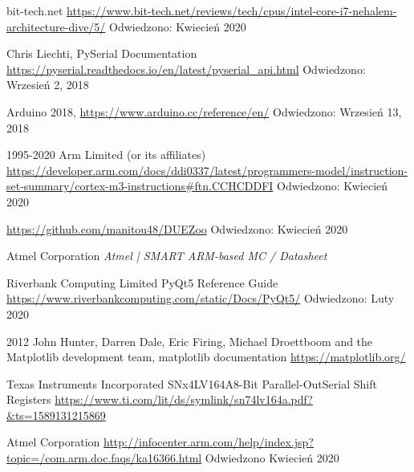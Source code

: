 \begin{thebibliography}{99}
        bit-tech.net
        \url{https://www.bit-tech.net/reviews/tech/cpus/intel-core-i7-nehalem-architecture-dive/5/}
        Odwiedzono:
        Kwiecień 2020

        Chris Liechti,	
        PySerial Documentation
	\url{https://pyserial.readthedocs.io/en/latest/pyserial_api.html}
        Odwiedzono: Wrzesień 2, 2018
        
	 Arduino 2018,
	 \url{https://www.arduino.cc/reference/en/}
        Odwiedzono: Wrzesień 13, 2018	 
        
        1995-2020 Arm Limited (or its affiliates)
        \url{https://developer.arm.com/docs/ddi0337/latest/programmers-model/instruction-set-summary/cortex-m3-instructions#ftn.CCHCDDFI}
        Odwiedzono: Kwiecień 2020

        \url{https://github.com/manitou48/DUEZoo}
        Odwiedzono: Kwiecień 2020

        Atmel Corporation
        \textit{Atmel | SMART ARM-based MC  / Datasheet}

        Riverbank Computing Limited
        PyQt5 Reference Guide
        \url{https://www.riverbankcomputing.com/static/Docs/PyQt5/}
        Odwiedzono: Luty 2020

        2012 John Hunter, Darren Dale, Eric Firing, Michael Droettboom and the Matplotlib development team,
        matplotlib documentation
        \url{https://matplotlib.org/}

        Texas Instruments Incorporated
        SNx4LV164A8-Bit Parallel-OutSerial Shift Registers
        \url{https://www.ti.com/lit/ds/symlink/sn74lv164a.pdf?&ts=1589131215869}

        Atmel Corporation
        \url{http://infocenter.arm.com/help/index.jsp?topic=/com.arm.doc.faqs/ka16366.html}
        Odwiedzono Kwiecień 2020

\end{thebibliography}

